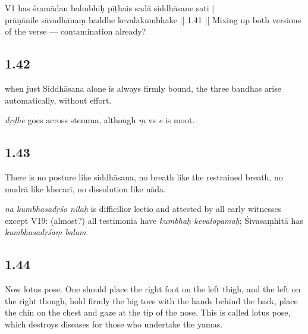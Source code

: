 \begin{ekdosis}
\begin{philcomm}[hp01_041]
V1 has 
\startverse
śramādau bahubhiḥ pīṭhais sadā siddhāsane sati  |\\
prāṇānile sāvadhānaṃ baddhe kevalakumbhake  || 1.41 ||
\endverse
Mixing up both versions of the verse — contamination already?
\end{philcomm}

\subsection*{1.42}
\begin{translation}[hp01_042]
when just Siddhāsana alone is always firmly bound, the three bandhas arise automatically, without effort.
\end{translation}

\begin{philcomm}[hp01_042]
\emph{dṛḍhe} goes across stemma, although \emph{ṃ} vs \emph{e} is moot.
\end{philcomm}

\subsection*{1.43}
\begin{translation}[hp01_043]
There is no posture like siddhāsana, no breath like the restrained breath, no mudrā like khecarī, no dissolution like nāda.
\end{translation}

\begin{philcomm}[hp01_043]
\emph{na kumbhasadṛśo nilaḥ} is difficilior lectio and attested by all early witnesses except V19: (almost?) all testimonia have \emph{kumbhaḥ kevalopamaḥ}; Śivasaṃhitā has \emph{kumbhasadṛśaṃ balam}.
\end{philcomm}

\subsection*{1.44}
\begin{translation}[hp01_044]
Now lotus pose.
One should place the right foot on the left thigh, and the left on the right though, hold firmly the big toes with the hands behind the back, place the chin on the chest and gaze at the tip of the nose. This is called lotus pose, which destroys diseases for those who undertake the yamas. 
\end{translation}


\end{ekdosis}
